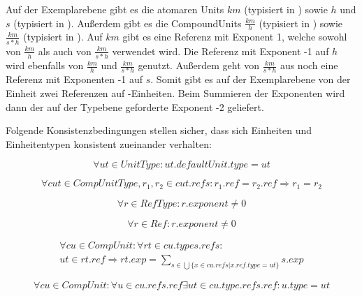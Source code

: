 Auf der Exemplarebene gibt es die atomaren Units $km$ (typisiert in ) sowie $h$ und $s$ (typisiert in ). 
Außerdem gibt es die CompoundUnits $\frac{km}{h}$ (typisiert in ) 
sowie $\frac{km}{s*h}$ (typisiert in ). Auf $km$ gibt es eine Referenz mit Exponent 1, 
welche sowohl von $\frac{km}{h}$ als auch von $\frac{km}{s*h}$ verwendet wird. 
Die Referenz mit Exponent -1 auf $h$ wird ebenfalls von $\frac{km}{h}$ und $\frac{km}{s*h}$ genutzt. 
Außerdem geht von $\frac{km}{s*h}$ aus noch eine Referenz mit Exponenten -1 auf $s$. 
Somit gibt es auf der Exemplarebene von der Einheit  zwei Referenzen auf -Einheiten. 
Beim Summieren der Exponenten wird dann der auf der Typebene geforderte Exponent -2 geliefert.

\newpage
{}

Folgende Konsistenzbedingungen stellen sicher, dass sich Einheiten und Einheitentypen konsistent zueinander verhalten:

\begin{equation} \forall ut \in UnitType : ut.defaultUnit.type = ut \end{equation}

\begin{equation} \forall cut \in CompUnitType, r_1, r_2 \in cut.refs : r_1.ref = r_2.ref \Rightarrow r_1 = r_2 \end{equation}

\begin{equation} \forall r \in RefType : r.exponent \ne 0 \end{equation}

\begin{equation} \forall r \in Ref : r.exponent \ne 0 \end{equation}

\begin{equation} 
\begin{split}
\forall cu \in CompUnit: \forall rt \in cu.types.refs:\\
ut \in rt.ref \Rightarrow rt.exp = \sum_{s \in \bigcup \{ x \in cu.refs | x.ref.type = ut \}} s.exp 
\end{split}
\end{equation}

 
\begin{equation} \forall cu \in CompUnit :
\forall u \in cu.refs.ref \exists ut \in cu.type.refs.ref : u.type = ut \end{equation}

